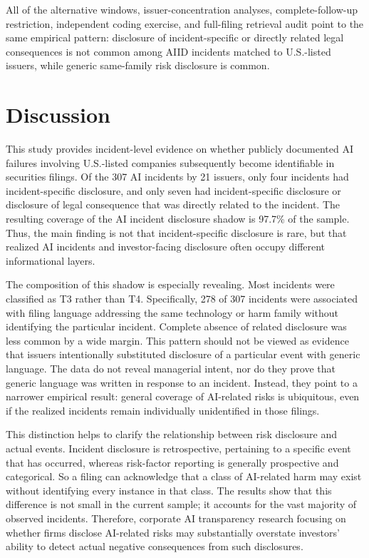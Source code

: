 \documentclass[utf8]{FrontiersinHarvard}
\begin{document}
All of the alternative windows, issuer-concentration analyses, complete-follow-up restriction, independent coding exercise, and full-filing retrieval audit point to the same empirical pattern: disclosure of incident-specific or directly related legal consequences is not common among AIID incidents matched to U.S.-listed issuers, while generic same-family risk disclosure is common.

\section{Discussion}

This study provides incident-level evidence on whether publicly documented AI failures involving U.S.-listed companies subsequently become identifiable in securities filings. Of the 307 AI incidents by 21 issuers, only four incidents had incident-specific disclosure, and only seven had incident-specific disclosure or disclosure of legal consequence that was directly related to the incident. The resulting coverage of the AI incident disclosure shadow is 97.7\% of the sample. Thus, the main finding is not that incident-specific disclosure is rare, but that realized AI incidents and investor-facing disclosure often occupy different informational layers.

The composition of this shadow is especially revealing. Most incidents were classified as T3 rather than T4. Specifically, 278 of 307 incidents were associated with filing language addressing the same technology or harm family without identifying the particular incident. Complete absence of related disclosure was less common by a wide margin. This pattern should not be viewed as evidence that issuers intentionally substituted disclosure of a particular event with generic language. The data do not reveal managerial intent, nor do they prove that generic language was written in response to an incident. Instead, they point to a narrower empirical result: general coverage of AI-related risks is ubiquitous, even if the realized incidents remain individually unidentified in those filings.

This distinction helps to clarify the relationship between risk disclosure and actual events. Incident disclosure is retrospective, pertaining to a specific event that has occurred, whereas risk-factor reporting is generally prospective and categorical. So a filing can acknowledge that a class of AI-related harm may exist without identifying every instance in that class. The results show that this difference is not small in the current sample; it accounts for the vast majority of observed incidents. Therefore, corporate AI transparency research focusing on whether firms disclose AI-related risks may substantially overstate investors' ability to detect actual negative consequences from such disclosures.
\end{document}
